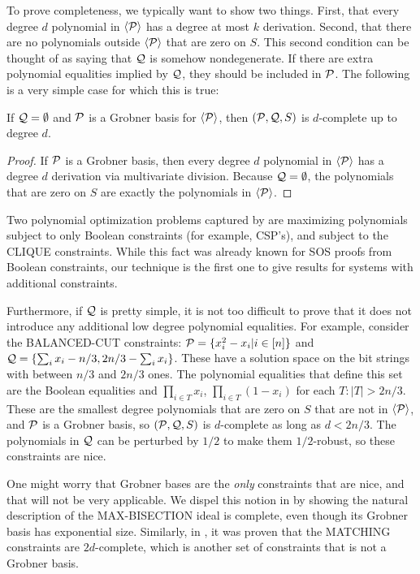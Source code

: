 To prove completeness, we typically want to show two things. First, that every degree $d$ polynomial in $\langle \mathcal P\rangle$ has a degree at most $k$ derivation. Second, that there are no polynomials outside $\langle \mathcal P\rangle$ that are zero on $S$. This second condition can be thought of as saying that $\mathcal Q$ is somehow nondegenerate. If there are extra polynomial equalities implied by $\mathcal Q$, they should be included in $\mathcal P$. The following is a very simple case for which this is true:
\begin{lemma}\label{lem:grobner}
If $\mathcal Q = \emptyset$ and $\mathcal P$ is a Grobner basis for $\langle \mathcal P\rangle$, then $(\mathcal P,\mathcal Q,S)$ is $d$-complete up to degree $d$. 
\end{lemma}
\begin{proof}
If $\mathcal P$ is a Grobner basis, then every degree $d$ polynomial in $\langle \mathcal P\rangle$ has a degree $d$ derivation via multivariate division. Because $\mathcal Q = \emptyset$, the polynomials that are zero on $S$ are exactly the polynomials in $\langle \mathcal P\rangle$. 
\end{proof}
Two polynomial optimization problems captured by  are maximizing polynomials subject to only Boolean constraints (for example, CSP's), and subject to the CLIQUE constraints. While this fact was already known for SOS proofs from Boolean constraints, our technique is the first one to give results for systems with additional constraints. 

Furthermore, if $\mathcal Q$ is pretty simple, it is not too difficult to prove that it does not introduce any additional low degree polynomial equalities. For example, consider the BALANCED-CUT constraints: $\mathcal P = \{x_i^2-x_i | i \in [n]\}$ and $\mathcal Q = \{\sum_i x_i - n/3, 2n/3 - \sum_i x_i\}$. These have a solution space on the bit strings with between $n/3$ and $2n/3$ ones. The polynomial equalities that define this set are the Boolean equalities and $\prod_{i \in T} x_i$, $\prod_{i \in T} (1-x_i)$ for each $T: |T| > 2n/3$. These are the smallest degree polynomials that are zero on $S$ that are not in $\langle \mathcal P\rangle$, and $\mathcal P$ is a Grobner basis, so $(\mathcal P, \mathcal Q, S)$ is $d$-complete as long as $d < 2n/3$. The polynomials in $\mathcal Q$ can be perturbed by $1/2$ to make them $1/2$-robust, so these constraints are nice. 

One might worry that Grobner bases are the \emph{only} constraints that are nice, and that  will not be very applicable. We dispel this notion in  by showing the natural description of the MAX-BISECTION ideal is complete, even though its Grobner basis has exponential size. Similarly, in \cite{}, it was proven that the MATCHING constraints are $2d$-complete, which is another set of constraints that is not a Grobner basis. 

